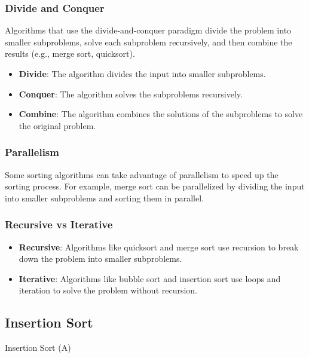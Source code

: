 \subsubsection*{Divide and Conquer}

Algorithms that use the divide-and-conquer paradigm divide the problem into smaller subproblems, solve each subproblem recursively, and then combine the results (e.g., merge sort, quicksort).
\begin{itemize}
    \item \textbf{Divide}: The algorithm divides the input into smaller subproblems.
    \item \textbf{Conquer}: The algorithm solves the subproblems recursively.
    \item \textbf{Combine}: The algorithm combines the solutions of the subproblems to solve the original problem.
\end{itemize}

\subsubsection*{Parallelism}

Some sorting algorithms can take advantage of parallelism to speed up the sorting process. For example, merge sort can be parallelized by dividing the input into smaller subproblems and sorting them in parallel.

\subsubsection*{Recursive vs Iterative}

\begin{itemize}
    \item \textbf{Recursive}: Algorithms like quicksort and merge sort use recursion to break down the problem into smaller subproblems.
    \item \textbf{Iterative}: Algorithms like bubble sort and insertion sort use loops and iteration to solve the problem without recursion.
\end{itemize}


\newpage

\subsection{Insertion Sort}

\begin{algorithm}[H]
    \caption{Insertion Sort (A)}
\end{algorithm}

